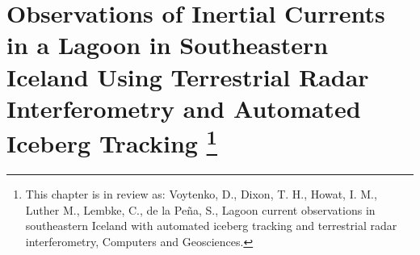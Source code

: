 % 
% 
% 
% 
% 
% 
% 
% 
% 
% 
% 
% 
% 
% 
% 
% 
% 
% 
% 


\chapter[Observations of Inertial Currents in a Lagoon in Southeastern Iceland Using Terrestrial Radar Interferometry and Automated Iceberg Tracking]{Observations of Inertial Currents in a Lagoon in Southeastern Iceland Using Terrestrial Radar Interferometry and Automated Iceberg Tracking \footnote{This chapter is in review as: Voytenko, D., Dixon, T. H., Howat, I. M., Luther M., Lembke, C., de la Peña, S., Lagoon current observations in southeastern Iceland with automated iceberg tracking and terrestrial radar interferometry, Computers and Geosciences.}}



